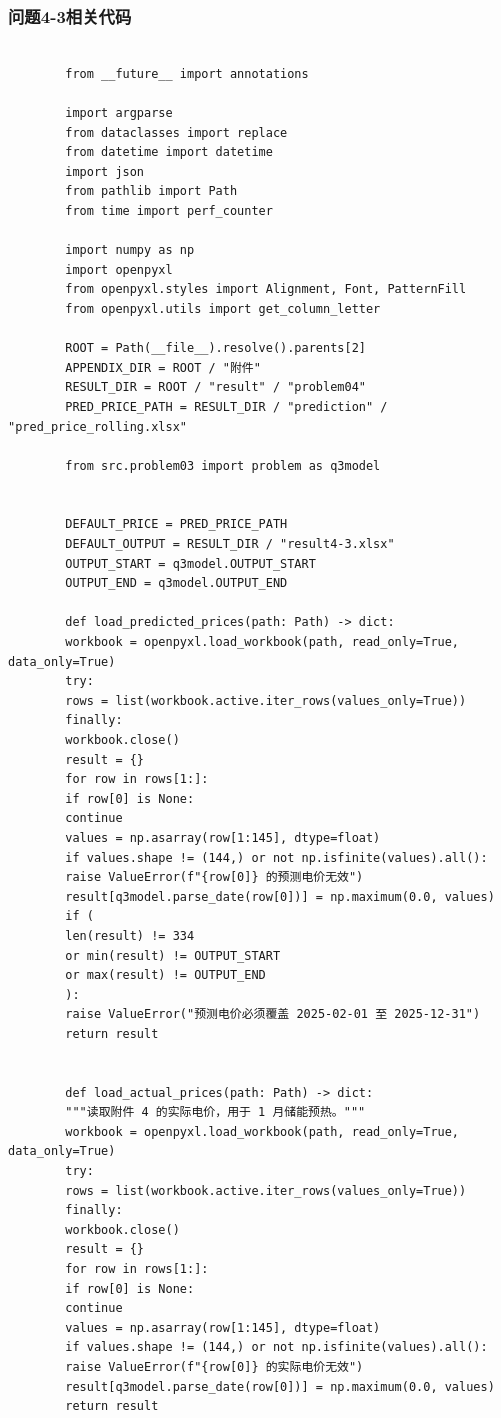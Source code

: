 \documentclass[UTF8]{ctexart}
\begin{document}
    \subsubsection*{问题4-3相关代码}
    
    \begin{verbatim}
        
        from __future__ import annotations
        
        import argparse
        from dataclasses import replace
        from datetime import datetime
        import json
        from pathlib import Path
        from time import perf_counter
        
        import numpy as np
        import openpyxl
        from openpyxl.styles import Alignment, Font, PatternFill
        from openpyxl.utils import get_column_letter
        
        ROOT = Path(__file__).resolve().parents[2]
        APPENDIX_DIR = ROOT / "附件"
        RESULT_DIR = ROOT / "result" / "problem04"
        PRED_PRICE_PATH = RESULT_DIR / "prediction" / "pred_price_rolling.xlsx"
        
        from src.problem03 import problem as q3model
        
        
        DEFAULT_PRICE = PRED_PRICE_PATH
        DEFAULT_OUTPUT = RESULT_DIR / "result4-3.xlsx"
        OUTPUT_START = q3model.OUTPUT_START
        OUTPUT_END = q3model.OUTPUT_END
        
        def load_predicted_prices(path: Path) -> dict:
        workbook = openpyxl.load_workbook(path, read_only=True, data_only=True)
        try:
        rows = list(workbook.active.iter_rows(values_only=True))
        finally:
        workbook.close()
        result = {}
        for row in rows[1:]:
        if row[0] is None:
        continue
        values = np.asarray(row[1:145], dtype=float)
        if values.shape != (144,) or not np.isfinite(values).all():
        raise ValueError(f"{row[0]} 的预测电价无效")
        result[q3model.parse_date(row[0])] = np.maximum(0.0, values)
        if (
        len(result) != 334
        or min(result) != OUTPUT_START
        or max(result) != OUTPUT_END
        ):
        raise ValueError("预测电价必须覆盖 2025-02-01 至 2025-12-31")
        return result
        
        
        def load_actual_prices(path: Path) -> dict:
        """读取附件 4 的实际电价，用于 1 月储能预热。"""
        workbook = openpyxl.load_workbook(path, read_only=True, data_only=True)
        try:
        rows = list(workbook.active.iter_rows(values_only=True))
        finally:
        workbook.close()
        result = {}
        for row in rows[1:]:
        if row[0] is None:
        continue
        values = np.asarray(row[1:145], dtype=float)
        if values.shape != (144,) or not np.isfinite(values).all():
        raise ValueError(f"{row[0]} 的实际电价无效")
        result[q3model.parse_date(row[0])] = np.maximum(0.0, values)
        return result
        

\end{verbatim}
\end{document}
